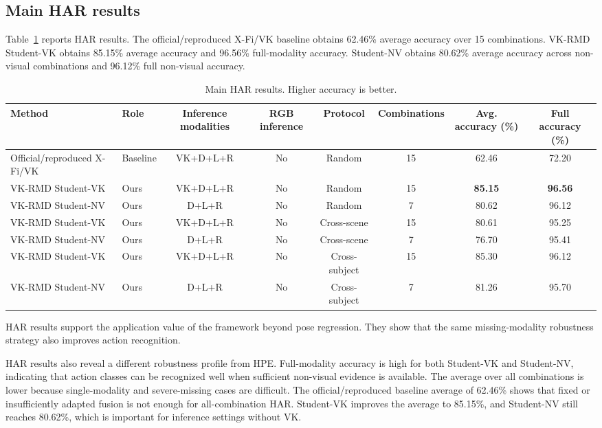 \documentclass[preprint,12pt]{elsarticle}
\newcommand{\method}{VK-RMD}
\begin{document}
\subsection{Main HAR results}

Table~\ref{tab:har_main} reports HAR results. The official/reproduced X-Fi/VK baseline obtains 62.46\% average accuracy over 15 combinations. \method{} Student-VK obtains 85.15\% average accuracy and 96.56\% full-modality accuracy. Student-NV obtains 80.62\% average accuracy across non-visual combinations and 96.12\% full non-visual accuracy.

\begin{table}[t]
\centering
\caption{Main HAR results. Higher accuracy is better.}
\label{tab:har_main}
\begin{adjustbox}{width=\textwidth}
\begin{tabular}{llcccccc}
\toprule
Method & Role & Inference modalities & RGB inference & Protocol & Combinations & Avg. accuracy (\%) & Full accuracy (\%) \\
\midrule
Official/reproduced X-Fi/VK & Baseline & VK+D+L+R & No & Random & 15 & 62.46 & 72.20 \\
\method{} Student-VK & Ours & VK+D+L+R & No & Random & 15 & \textbf{85.15} & \textbf{96.56} \\
\method{} Student-NV & Ours & D+L+R & No & Random & 7 & 80.62 & 96.12 \\
\method{} Student-VK & Ours & VK+D+L+R & No & Cross-scene & 15 & 80.61 & 95.25 \\
\method{} Student-NV & Ours & D+L+R & No & Cross-scene & 7 & 76.70 & 95.41 \\
\method{} Student-VK & Ours & VK+D+L+R & No & Cross-subject & 15 & 85.30 & 96.12 \\
\method{} Student-NV & Ours & D+L+R & No & Cross-subject & 7 & 81.26 & 95.70 \\
\bottomrule
\end{tabular}
\end{adjustbox}
\end{table}

HAR results support the application value of the framework beyond pose regression. They show that the same missing-modality robustness strategy also improves action recognition.

HAR results also reveal a different robustness profile from HPE. Full-modality accuracy is high for both Student-VK and Student-NV, indicating that action classes can be recognized well when sufficient non-visual evidence is available. The average over all combinations is lower because single-modality and severe-missing cases are difficult. The official/reproduced baseline average of 62.46\% shows that fixed or insufficiently adapted fusion is not enough for all-combination HAR. Student-VK improves the average to 85.15\%, and Student-NV still reaches 80.62\%, which is important for inference settings without VK.
\end{document}
